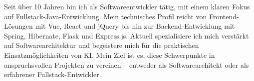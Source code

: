 \par{
Seit über 10 Jahren bin ich als Softwareentwickler tätig, mit einem klaren Fokus auf Fullstack-Java-Entwicklung.
Mein technisches Profil reicht von Frontend-Lösungen mit Vue, React und jQuery bis hin zur Backend-Entwicklung
mit Spring, Hibernate, Flask und Express.js. Aktuell spezialisiere ich mich verstärkt auf Softwarearchitektur
und begeistere mich für die praktischen Einsatzmöglichkeiten von KI. Mein Ziel ist es, diese Schwerpunkte
in anspruchsvollen Projekten zu vereinen – entweder als Softwarearchitekt oder als erfahrener Fullstack-Entwickler.
}